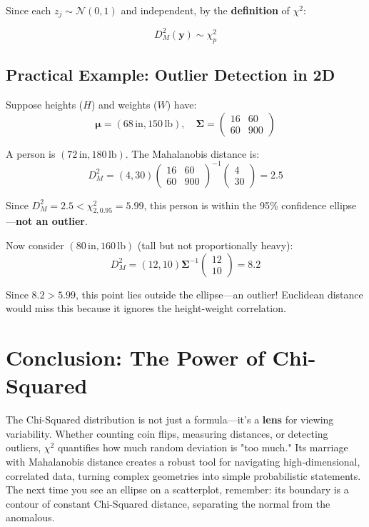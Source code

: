 \documentclass{article}
\begin{document}
Since each $z_j \sim \mathcal{N}(0,1)$ and independent, by the \textbf{definition} of $\chi^2$:

\begin{equation}
    \boxed{D_M^2(\mathbf{y}) \sim \chi^2_p}
\end{equation}

\subsection*{Practical Example: Outlier Detection in 2D}

Suppose heights ($H$) and weights ($W$) have:
\[
\boldsymbol{\mu} = (68\,\text{in}, 150\,\text{lb}), \quad \boldsymbol{\Sigma} = \begin{pmatrix} 16 & 60 \\ 60 & 900 \end{pmatrix}
\]

A person is $(72\,\text{in}, 180\,\text{lb})$. The Mahalanobis distance is:
\[
D_M^2 = (4, 30) \begin{pmatrix} 16 & 60 \\ 60 & 900 \end{pmatrix}^{-1} \begin{pmatrix} 4 \\ 30 \end{pmatrix} = 2.5
\]

Since $D_M^2 = 2.5 < \chi^2_{2,0.95} = 5.99$, this person is within the 95\% confidence ellipse—\textbf{not an outlier}.

Now consider $(80\,\text{in}, 160\,\text{lb})$ (tall but not proportionally heavy):
\[
D_M^2 = (12, 10) \boldsymbol{\Sigma}^{-1} \begin{pmatrix} 12 \\ 10 \end{pmatrix} = 8.2
\]

Since $8.2 > 5.99$, this point lies outside the ellipse—an outlier! Euclidean distance would miss this because it ignores the height-weight correlation.

\section{Conclusion: The Power of Chi-Squared}

The Chi-Squared distribution is not just a formula—it's a \textbf{lens} for viewing variability. Whether counting coin flips, measuring distances, or detecting outliers, $\chi^2$ quantifies how much random deviation is "too much." Its marriage with Mahalanobis distance creates a robust tool for navigating high-dimensional, correlated data, turning complex geometries into simple probabilistic statements. The next time you see an ellipse on a scatterplot, remember: its boundary is a contour of constant Chi-Squared distance, separating the normal from the anomalous.
\end{document}
